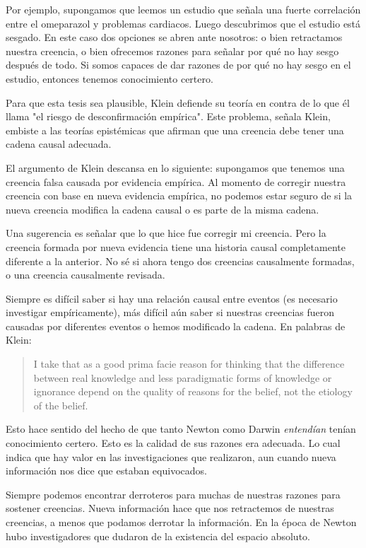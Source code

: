 {{{{{Por ejemplo, supongamos que leemos un estudio que señala una fuerte correlación entre el omeparazol y problemas cardiacos.
Luego descubrimos que el estudio está sesgado.
En este caso dos opciones se abren ante nosotros: o bien retractamos nuestra creencia, o bien ofrecemos razones para señalar por qué no hay sesgo después de todo.
Si somos capaces de dar razones de por qué no hay sesgo en el estudio, entonces tenemos conocimiento certero.

Para que esta tesis sea plausible, Klein defiende su teoría en contra de lo que él llama "el riesgo de desconfirmación empírica".
Este problema, señala Klein, embiste a las teorías epistémicas que afirman que una creencia debe tener una cadena causal adecuada.

El argumento de Klein descansa en lo siguiente: supongamos que tenemos una creencia falsa causada por evidencia empírica.
Al momento de corregir nuestra creencia con base en nueva evidencia empírica, no podemos estar seguro de si la nueva creencia modifica la cadena causal o es parte de la misma cadena.

Una sugerencia es señalar que lo que hice fue corregir mi creencia.
Pero la creencia formada por nueva evidencia tiene una historia causal completamente diferente a la anterior.
No sé si ahora tengo dos creencias causalmente formadas, o una creencia causalmente revisada.

Siempre es difícil saber si hay una relación causal entre eventos (es necesario investigar empíricamente), más difícil aún saber si nuestras creencias fueron causadas por diferentes eventos o hemos modificado la cadena.
En palabras de Klein:

\begin{quote}
    I take that as a good prima facie reason for thinking that the difference between real knowledge and less paradigmatic forms of knowledge or ignorance depend on the quality of reasons for the belief, not the etiology of the belief. %
\end{quote}

Esto hace sentido del hecho de que tanto Newton como Darwin \emph{entendían} tenían conocimiento certero.
Esto es la calidad de sus razones era adecuada.
Lo cual indica que hay valor en las investigaciones que realizaron, aun cuando nueva información nos dice que estaban equivocados.

Siempre podemos encontrar derroteros para muchas de nuestras razones para sostener creencias.
Nueva información hace que nos retractemos de nuestras creencias, a menos que podamos derrotar la información.
En la época de Newton hubo investigadores que dudaron de la existencia del espacio absoluto.

}}}}}
